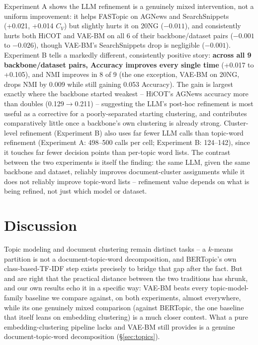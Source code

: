 \documentclass[11pt]{article}
\begin{document}
Experiment A shows the LLM refinement is a genuinely mixed intervention, not a uniform improvement: it helps FASTopic on AGNews and SearchSnippets (+0.021, +0.014 $C_V$) but slightly hurts it on 20NG ($-0.011$), and consistently hurts both HiCOT and VAE-BM on all 6 of their backbone/dataset pairs ($-0.001$ to $-0.026$), though VAE-BM's SearchSnippets drop is negligible ($-0.001$). Experiment B tells a markedly different, consistently positive story: \textbf{across all 9 backbone/dataset pairs, Accuracy improves every single time} (+0.017 to +0.105), and NMI improves in 8 of 9 (the one exception, VAE-BM on 20NG, drops NMI by 0.009 while still gaining 0.053 Accuracy). The gain is largest exactly where the backbone started weakest -- HiCOT's AGNews accuracy more than doubles (0.129$\to$0.211) -- suggesting the LLM's post-hoc refinement is most useful as a corrective for a poorly-separated starting clustering, and contributes comparatively little once a backbone's own clustering is already strong. Cluster-level refinement (Experiment B) also uses far fewer LLM calls than topic-word refinement (Experiment A: 498--500 calls per cell; Experiment B: 124--142), since it touches far fewer decision points than per-topic word lists. The contrast between the two experiments is itself the finding: the same LLM, given the same backbone and dataset, reliably improves document-cluster assignments while it does not reliably improve topic-word lists -- refinement value depends on what is being refined, not just which model or dataset.

\section{Discussion}
\label{sec:discussion}

Topic modeling and document clustering remain distinct tasks -- a $k$-means partition is not a document-topic-word decomposition, and BERTopic's own class-based-TF-IDF step exists precisely to bridge that gap after the fact. But \citet{zhang2022neuraltopicclustering} and \citet{sia2020tired} are right that the practical distance between the two traditions has shrunk, and our own results echo it in a specific way: VAE-BM beats every topic-model-family baseline we compare against, on both experiments, almost everywhere, while its one genuinely mixed comparison (against BERTopic, the one baseline that itself leans on embedding clustering) is a much closer contest. What a pure embedding-clustering pipeline lacks and VAE-BM still provides is a genuine document-topic-word decomposition (\S\ref{sec:topics}).
\end{document}
